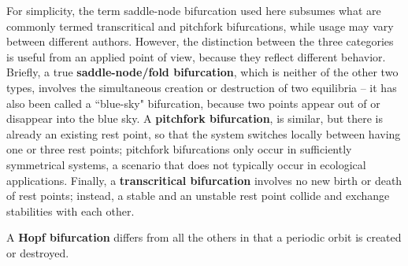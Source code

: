 For simplicity, the term saddle-node bifurcation used here subsumes what are commonly termed transcritical and pitchfork bifurcations, while usage may vary between different authors. However, the distinction between the three categories is useful from an applied point of view, because they reflect different behavior. Briefly, a true \textbf{saddle-node/fold bifurcation}, which is neither of the other two types, involves the simultaneous creation or destruction of two equilibria -- it has also been called a ``blue-sky" bifurcation, because two points appear out of or disappear into the blue sky. A \textbf{pitchfork bifurcation}, is similar, but there is already an existing rest point, so that the system switches locally between having one or three rest points; pitchfork bifurcations only occur in sufficiently symmetrical systems, a scenario that does not typically occur in ecological applications. Finally, a \textbf{transcritical bifurcation} involves no new birth or death of rest points; instead, a stable and an unstable rest point collide and exchange stabilities with each other. 

A \textbf{Hopf bifurcation} differs from all the others in that a periodic orbit is created or destroyed. 

%	
%	
%	
%
%	

